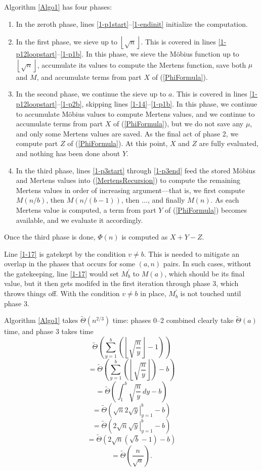 \documentclass[12pt]{article}
\newcommand{\eqn}[1]{\begin{displaymath} #1 \end{displaymath}}
\newcommand{\floor}[1]{{\left\lfloor #1 \right\rfloor}}
\newcommand{\integral}[4]{\displaystyle\int_{#3}^{#4} \! #1 \, d#2}
\newcommand{\eval}[3]{\left. #1 \right|_{#2}^{#3}}
\newcommand{\isqrt}[1]{\floor{\sqrt{#1}}}
\newcommand{\softTheta}[0]{\widetilde{\Theta}}
\begin{document}
Algorithm \ref{Algo1} has four phases:
\begin{enumerate} \addtocounter{enumi}{-1}
\item In the zeroth phase, lines \ref{1-p1start}--\ref{1-endinit} initialize the computation.
\item In the first phase, we sieve up to $\isqrt{n}$.  This is covered in lines \ref{1-p12loopstart}--\ref{1-p1b}.  In this phase, we sieve the M\"{o}bius function up to $\isqrt{n}$, accumulate its values to compute the Mertens function, save both $\mu$ and $M$, and accumulate terms from part $X$ of (\ref{PhiFormula}).
\item In the second phase, we continue the sieve up to $a$.  This is covered in lines \ref{1-p12loopstart}--\ref{1-p2b}, skipping lines \ref{1-14}--\ref{1-p1b}.  In this phase, we continue to accumulate M\"{o}bius values to compute Mertens values, and we continue to accumulate terms from part $X$ of (\ref{PhiFormula}), but we do not save any $\mu$, and only some Mertens values are saved.  As the final act of phase 2, we compute part $Z$ of (\ref{PhiFormula}).  At this point, $X$ and $Z$ are fully evaluated, and nothing has been done about $Y$.
\item In the third phase, lines \ref{1-p3start} through \ref{1-p3end} feed the stored M\"{o}bius and Mertens values into (\ref{MertensRecursion}) to compute the remaining Mertens values in order of increasing argument---that is, we first compute $M(n/b)$, then $M(n/(b-1))$, then ..., and finally $M(n)$.  As each Mertens value is computed, a term from part $Y$ of (\ref{PhiFormula}) becomes available, and we evaluate it accordingly.
\end{enumerate}
Once the third phase is done, $\Phi(n)$ is computed as $X+Y-Z$.

Line \ref{1-17} is gatekept by the condition $v \neq b$.  This is needed to mitigate an overlap in the phases that occurs for some $(a,n)$ pairs.  In such cases, without the gatekeeping, line \ref{1-17} would set $M^\prime_b$ to $M(a)$, which should be its final value, but it then gets modifed in the first iteration through phase 3, which throws things off.  With the condition $v \neq b$ in place, $M^\prime_b$ is not touched until phase 3.

Algorithm \ref{Algo1} takes $\softTheta(n^{2/3})$ time: phases 0--2 combined clearly take $\softTheta(a)$ time, and phase 3 takes time
\eqn{\softTheta \left( \sum_{y=1}^b \left( \isqrt{\frac{n}{y}} - 1 \right) \right)}
\eqn{= \softTheta \left( \sum_{y=1}^b \left( \isqrt{\frac{n}{y}} \right) - b \right)}
\eqn{= \softTheta \left( \integral{ \sqrt{\frac{n}{y}} }{y}{1}{b} - b \right)}
\eqn{= \softTheta \left( \sqrt{n} 2 \eval{\sqrt{y}}{y=1}{b} - b \right)}
\eqn{= \softTheta \left( 2 \sqrt{n} \eval{\sqrt{y}}{y=1}{b} - b \right)}
\eqn{= \softTheta \left( 2 \sqrt{n} \left( \sqrt{b} - 1 \right) - b \right)}
\eqn{= \softTheta \left( \frac{n}{\sqrt{a}} \right).}
\end{document}
